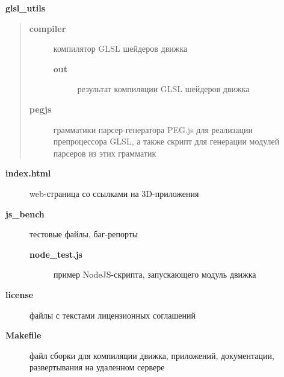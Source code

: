 \documentclass[a4paper,12pt,oneside]{sphinxmanual}
\begin{document}
\textbf{glsl\_utils}
\begin{quote}
\begin{description}
\item[{\textbf{compiler}}] \leavevmode
компилятор GLSL шейдеров движка
\begin{description}
\item[{\textbf{out}}] \leavevmode
результат компиляции GLSL шейдеров движка

\end{description}

\item[{\textbf{pegjs}}] \leavevmode
грамматики парсер-генератора PEG.js для реализации препроцессора GLSL, а также скрипт для генерации модулей парсеров из этих грамматик

\end{description}
\end{quote}
\begin{description}
\item[{\textbf{index.html}}] \leavevmode
web-страница со ссылками на 3D-приложения

\item[{\textbf{js\_bench}}] \leavevmode
тестовые файлы, баг-репорты
\begin{description}
\item[{\textbf{node\_test.js}}] \leavevmode
пример NodeJS-скрипта, запускающего модуль движка

\end{description}

\item[{\textbf{license}}] \leavevmode
файлы с текстами лицензионных соглашений

\item[{\textbf{Makefile}}] \leavevmode
файл сборки для компиляции движка, приложений, документации, развертывания на удаленном сервере

\end{description}
\end{document}
